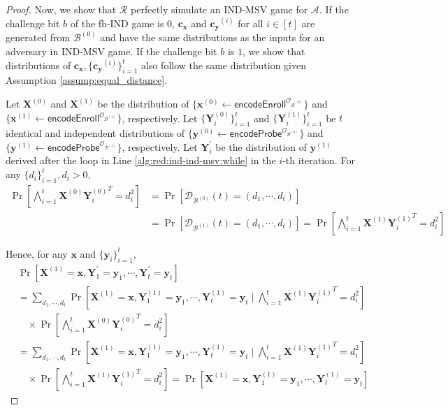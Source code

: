 \begin{proof}
Now, we show that $\mathcal{R}$ perfectly simulate an \textsf{IND-MSV} game for $\mathcal{A}$. If the challenge bit $b$ of the \textsf{fh-IND} game is $0$, $\mathbf{c_x}$ and $\mathbf{c_y}^{(i)}$ for all $i \in [t]$ are generated from $\mathcal{B}^{(0)}$ and have the same distributions as the inputs for an adversary in \textsf{IND-MSV} game.
If the challenge bit $b$ is $1$, we show that distributions of $\mathbf{c_x}, \{ \mathbf{c_y}^{(i)} \}_{i=1}^t$ also follow the same distribution given Assumption \ref{assump:equal_distance}.

Let $\mathbf{X}^{(0)}$ and $\mathbf{X}^{(1)}$ be the distribution of $\{ \mathbf{x}^{(0)} \gets \textsf{encodeEnroll}^{\mathcal{O}_{\mathcal{B}^{(0)}}} \}$ and $\{ \mathbf{x}^{(1)} \gets \textsf{encodeEnroll}^{\mathcal{O}_{\mathcal{B}^{(1)}}} \}$, respectively.
Let $\{ \mathbf{Y}^{(0)}_i \}_{i = 1}^t$ and $\{ \mathbf{Y}^{(1)}_i \}_{i = 1}^t$ be $t$ identical and independent distributions of $\{ \mathbf{y}^{(0)} \gets \textsf{encodeProbe}^{\mathcal{O}_{\mathcal{B}^{(0)}}} \}$ and $\{ \mathbf{y}^{(1)} \gets \textsf{encodeProbe}^{\mathcal{O}_{\mathcal{B}^{(1)}}} \}$, respectively.
Let $\mathbf{Y}^\prime_i$ be the distribution of $\mathbf{y}^{(1)}$ derived after the loop in Line \ref{alg:red:ind-ind-msv:while} in the $i$-th iteration.
For any $\{ d_i \}_{i=1}^t, d_i > 0$,
\begin{align*}
\Pr \left[ \bigwedge_{i=1}^t \mathbf{X}^{(0)} {\mathbf{Y}^{(0)}_i}^T = d_i^2 \right] 
&= \Pr \left[ \mathcal{D}_{\mathcal{B}^{(0)}}(t) = (d_1, \cdots, d_t) \right] \\
&= \Pr \left[ \mathcal{D}_{\mathcal{B}^{(1)}}(t) = (d_1, \cdots, d_t) \right] = \Pr \left[ \bigwedge_{i=1}^t \mathbf{X}^{(1)} {\mathbf{Y}^{(1)}_i}^T = d_i^2 \right]
\end{align*}

Hence, for any $\mathbf{x}$ and $\{ \mathbf{y}_i \}_{i=1}^t$,
\begin{align*}
	& \Pr [\mathbf{X}^{(1)} = \mathbf{x}, \mathbf{Y}^\prime_1 = \mathbf{y}_1, \cdots, \mathbf{Y}^\prime_t = \mathbf{y}_t] \\
	&= \sum_{d_1, \cdots, d_t} \Pr \left[\mathbf{X}^{(1)} = \mathbf{x}, \mathbf{Y}^{(1)}_1 = \mathbf{y}_1, \cdots, \mathbf{Y}^{(1)}_t = \mathbf{y}_t \mid \bigwedge_{i=1}^t \mathbf{X}^{(1)} {\mathbf{Y}^{(1)}_i}^T = d_i^2 \right] \\
	&\quad \times \Pr \left[\bigwedge_{i=1}^t \mathbf{X}^{(0)} {\mathbf{Y}_i^{(0)}}^T = d_i^2 \right] \\
	&= \sum_{d_1, \cdots, d_t} \Pr \left[\mathbf{X}^{(1)} = \mathbf{x}, \mathbf{Y}^{(1)}_1 = \mathbf{y}_1, \cdots, \mathbf{Y}^{(1)}_t = \mathbf{y}_t \mid \bigwedge_{i=1}^t \mathbf{X}^{(1)} {\mathbf{Y}^{(1)}_i}^T = d_i^2 \right] \\
	&\quad \times \Pr \left[\bigwedge_{i=1}^t \mathbf{X}^{(1)} {\mathbf{Y}_i^{(1)}}^T = d_i^2 \right] = \Pr[\mathbf{X}^{(1)} = \mathbf{x}, \mathbf{Y}^{(1)}_1 = \mathbf{y}_1, \cdots, \mathbf{Y}^{(1)}_t = \mathbf{y}_t ]
\end{align*}


\end{proof}
